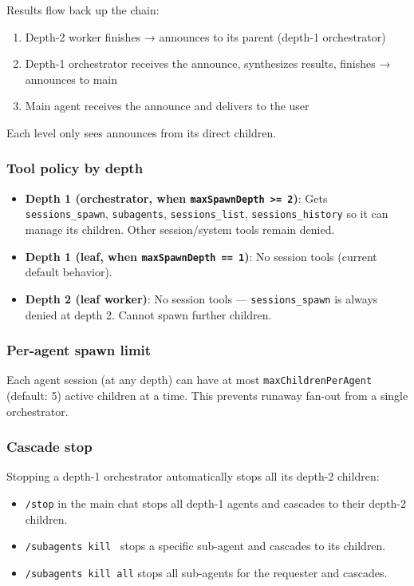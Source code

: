 Results flow back up the chain:

\begin{enumerate}
  \item Depth-2 worker finishes → announces to its parent (depth-1 orchestrator)
  \item Depth-1 orchestrator receives the announce, synthesizes results, finishes → announces to main
  \item Main agent receives the announce and delivers to the user
\end{enumerate}


Each level only sees announces from its direct children.

\subsubsection{Tool policy by depth}


\begin{itemize}
  \item \textbf{Depth 1 (orchestrator, when \texttt{maxSpawnDepth >= 2})}: Gets \texttt{sessions\_spawn}, \texttt{subagents}, \texttt{sessions\_list}, \texttt{sessions\_history} so it can manage its children. Other session/system tools remain denied.
  \item \textbf{Depth 1 (leaf, when \texttt{maxSpawnDepth == 1})}: No session tools (current default behavior).
  \item \textbf{Depth 2 (leaf worker)}: No session tools — \texttt{sessions\_spawn} is always denied at depth 2. Cannot spawn further children.
\end{itemize}


\subsubsection{Per-agent spawn limit}


Each agent session (at any depth) can have at most \texttt{maxChildrenPerAgent} (default: 5) active children at a time. This prevents runaway fan-out from a single orchestrator.

\subsubsection{Cascade stop}


Stopping a depth-1 orchestrator automatically stops all its depth-2 children:

\begin{itemize}
  \item \texttt{/stop} in the main chat stops all depth-1 agents and cascades to their depth-2 children.
  \item \texttt{/subagents kill } stops a specific sub-agent and cascades to its children.
  \item \texttt{/subagents kill all} stops all sub-agents for the requester and cascades.
\end{itemize}


